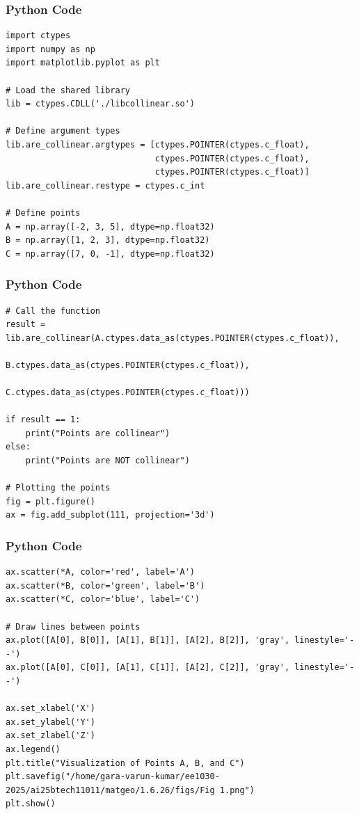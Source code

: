 \documentclass{beamer}
\begin{document}
\begin{frame}[fragile]
    \frametitle{Python Code}
    \begin{lstlisting}
import ctypes
import numpy as np
import matplotlib.pyplot as plt

# Load the shared library
lib = ctypes.CDLL('./libcollinear.so')

# Define argument types
lib.are_collinear.argtypes = [ctypes.POINTER(ctypes.c_float),
                              ctypes.POINTER(ctypes.c_float),
                              ctypes.POINTER(ctypes.c_float)]
lib.are_collinear.restype = ctypes.c_int

# Define points
A = np.array([-2, 3, 5], dtype=np.float32)
B = np.array([1, 2, 3], dtype=np.float32)
C = np.array([7, 0, -1], dtype=np.float32)
    \end{lstlisting}
\end{frame}

\begin{frame}[fragile]
    \frametitle{Python Code}
    \begin{lstlisting}
# Call the function
result = lib.are_collinear(A.ctypes.data_as(ctypes.POINTER(ctypes.c_float)),
                           B.ctypes.data_as(ctypes.POINTER(ctypes.c_float)),
                           C.ctypes.data_as(ctypes.POINTER(ctypes.c_float)))

if result == 1:
    print("Points are collinear")
else:
    print("Points are NOT collinear")

# Plotting the points
fig = plt.figure()
ax = fig.add_subplot(111, projection='3d')
    \end{lstlisting}
\end{frame}

\begin{frame}[fragile]
    \frametitle{Python Code}
    \begin{lstlisting}
ax.scatter(*A, color='red', label='A')
ax.scatter(*B, color='green', label='B')
ax.scatter(*C, color='blue', label='C')

# Draw lines between points
ax.plot([A[0], B[0]], [A[1], B[1]], [A[2], B[2]], 'gray', linestyle='--')
ax.plot([A[0], C[0]], [A[1], C[1]], [A[2], C[2]], 'gray', linestyle='--')

ax.set_xlabel('X')
ax.set_ylabel('Y')
ax.set_zlabel('Z')
ax.legend()
plt.title("Visualization of Points A, B, and C")
plt.savefig("/home/gara-varun-kumar/ee1030-2025/ai25btech11011/matgeo/1.6.26/figs/Fig 1.png")
plt.show()
    \end{lstlisting}
\end{frame}
\end{document}
